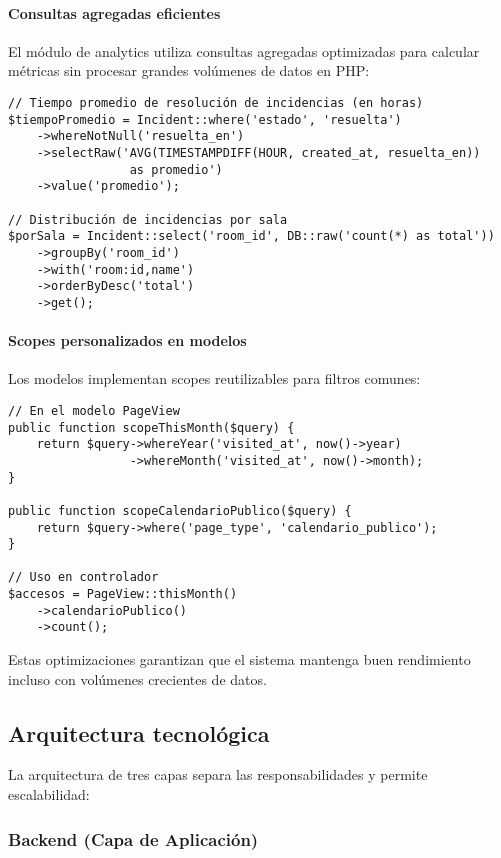 \paragraph{Consultas agregadas eficientes}

El módulo de analytics utiliza consultas agregadas optimizadas para calcular métricas sin procesar grandes volúmenes de datos en PHP:

\begin{verbatim}
// Tiempo promedio de resolución de incidencias (en horas)
$tiempoPromedio = Incident::where('estado', 'resuelta')
    ->whereNotNull('resuelta_en')
    ->selectRaw('AVG(TIMESTAMPDIFF(HOUR, created_at, resuelta_en)) 
                 as promedio')
    ->value('promedio');

// Distribución de incidencias por sala
$porSala = Incident::select('room_id', DB::raw('count(*) as total'))
    ->groupBy('room_id')
    ->with('room:id,name')
    ->orderByDesc('total')
    ->get();
\end{verbatim}

\paragraph{Scopes personalizados en modelos}

Los modelos implementan scopes reutilizables para filtros comunes:

\begin{verbatim}
// En el modelo PageView
public function scopeThisMonth($query) {
    return $query->whereYear('visited_at', now()->year)
                 ->whereMonth('visited_at', now()->month);
}

public function scopeCalendarioPublico($query) {
    return $query->where('page_type', 'calendario_publico');
}

// Uso en controlador
$accesos = PageView::thisMonth()
    ->calendarioPublico()
    ->count();
\end{verbatim}

Estas optimizaciones garantizan que el sistema mantenga buen rendimiento incluso con volúmenes crecientes de datos.

\subsection{Arquitectura tecnológica}

La arquitectura de tres capas separa las responsabilidades y permite escalabilidad:

\subsubsection{Backend (Capa de Aplicación)}

